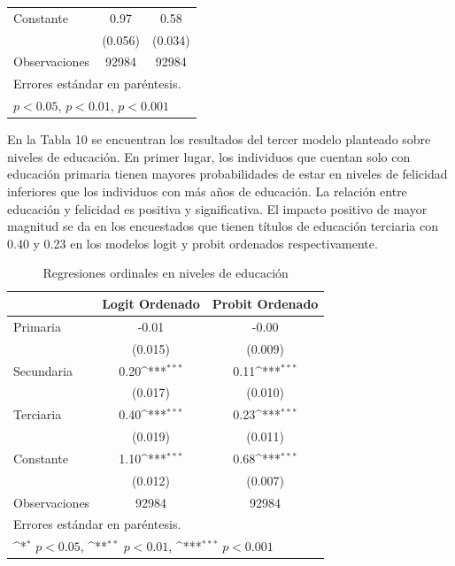 \documentclass[12pt,spanish]{article}
\begin{document}
\begin{table}[H]
{\begin{tabular}{l*{2}{c}}
Constante      &        0.97\sym{***}&        0.58\sym{***}\\
            &     (0.056)         &     (0.034)         \\
\hline
Observaciones       &       92984         &       92984         \\
\hline\hline
        \multicolumn{12}{l}{\footnotesize Errores estándar en paréntesis.}\\
        \multicolumn{12}{l}{\footnotesize \sym{*} \(p<0.05\), \sym{**} \(p<0.01\), \sym{***} \(p<0.001\)}\\
\end{tabular}
}
    \label{tab:tab5}
\end{table}
En la Tabla 10 se encuentran los resultados del tercer modelo planteado sobre niveles de educación. En primer lugar, los individuos que cuentan solo con educación primaria tienen mayores probabilidades de estar en niveles de felicidad inferiores que los individuos con más años de educación. La relación entre educación y felicidad es positiva y significativa. El impacto positivo de mayor magnitud se da en los encuestados que tienen títulos de educación terciaria con 0.40 y 0.23 en los modelos logit y probit ordenados respectivamente. 
\begin{table}[H]
    \caption{Regresiones ordinales en niveles de educación}
    \centering
{
\def\sym#1{\ifmmode^{#1}\else\(^{#1}\)\fi}
\begin{tabular}{l*{2}{c}}
\hline\hline
&\multicolumn{1}{c}{Logit Ordenado}&\multicolumn{1}{c}{Probit Ordenado}\\
\hline
Primaria    &       -0.01         &       -0.00         \\
            &     (0.015)         &     (0.009)         \\
[1em]
Secundaria  &        0.20\sym{***}&        0.11\sym{***}\\
            &     (0.017)         &     (0.010)         \\
[1em]
Terciaria   &        0.40\sym{***}&        0.23\sym{***}\\
            &     (0.019)         &     (0.011)         \\

Constante      &        1.10\sym{***}&        0.68\sym{***}\\
            &     (0.012)         &     (0.007)         \\
\hline
Observaciones       &       92984         &       92984         \\
\hline\hline
        \multicolumn{12}{l}{\footnotesize Errores estándar en paréntesis.}\\
        \multicolumn{12}{l}{\footnotesize \sym{*} \(p<0.05\), \sym{**} \(p<0.01\), \sym{***} \(p<0.001\)}\\
\end{tabular}
}
    \label{tab:tab5}
\end{table}
\end{document}
